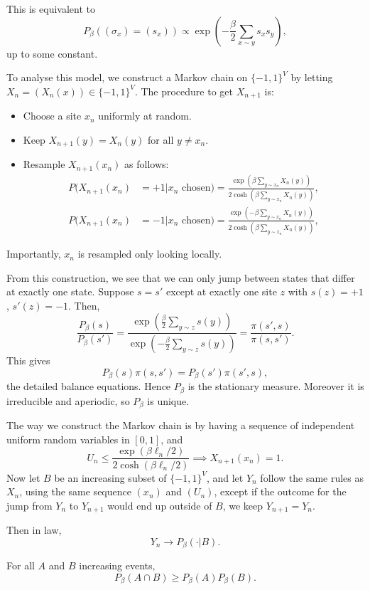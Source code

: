 \documentclass[12pt]{article}
\begin{document}
This is equivalent to
\[
P_\beta((\sigma_x) = (s_x)) \propto \exp \left( - \frac{\beta}{2} \sum_{x \sim y} s_x s_y \right),
\]
up to some constant.

To analyse this model, we construct a Markov chain on $\{-1, 1\}^{V}$ by letting $X_n = (X_n(x)) \in \{-1, 1\}^{V}$. The procedure to get $X_{n+1}$ is:
\begin{itemize}
	\item Choose a site $x_n$ uniformly at random.
	\item Keep $X_{n+1}(y) = X_n(y)$ for all $y \neq x_n$.
	\item Resample $X_{n+1}(x_n)$ as follows:
		\begin{align*}
			P(X_{n+1}(x_{n}) &= +1 | x_n \text{ chosen}) = \frac{\exp(\beta \sum_{y \sim x_n} X_n(y))}{2 \cosh (\beta \sum_{y \sim x_n} X_n(y))},\\
			P(X_{n+1}(x_{n}) &= -1 | x_n \text{ chosen}) = \frac{\exp(-\beta \sum_{y \sim x_n} X_n(y))}{2 \cosh (\beta \sum_{y \sim x_n} X_n(y))},
		\end{align*}
\end{itemize}
Importantly, $x_n$ is resampled only looking locally.

From this construction, we see that we can only jump between states that differ at exactly one state. Suppose $s = s'$ except at exactly one site $z$ with $s(z) = +1$, $s'(z) = -1$. Then,
 \[
\frac{P_\beta(s)}{P_\beta(s')} = \frac{\exp \left( \frac{\beta}{2} \sum_{y \sim z} s(y) \right)}{\exp \left( -\frac{\beta}{2} \sum_{y \sim z} s(y) \right)} = \frac{\pi(s', s)}{\pi(s, s')}.
\]
This gives
\[
P_\beta(s) \pi(s, s') = P_\beta(s') \pi(s', s),
\]
the detailed balance equations. Hence $P_\beta$ is the stationary measure. Moreover it is irreducible and aperiodic, so $P_\beta$ is unique.


The way we construct the Markov chain is by having a sequence of independent uniform random variables in $[0, 1]$, and
\[
U_n \leq \frac{\exp(\beta \ell_n/2)}{2 \cosh (\beta \ell_n/2)} \implies X_{n+1}(x_n) = 1.
\]
Now let $B$ be an increasing subset of $\{-1, 1\}^{V}$, and let $Y_n$ follow the same rules as $X_n$, using the same sequence $(x_n)$ and $(U_n)$, except if the outcome for the jump from $Y_n$ to $Y_{n+1}$ would end up outside of $B$, we keep $Y_{n+1} = Y_n$.

Then in law,
\[
Y_n \to P_\beta(\cdot | B).
\]
\begin{proposition}
	For all $A$ and $B$ increasing events,
	\[
	P_\beta(A \cap B) \geq P_\beta(A) P_\beta(B).
	\]
\end{proposition}
\end{document}
